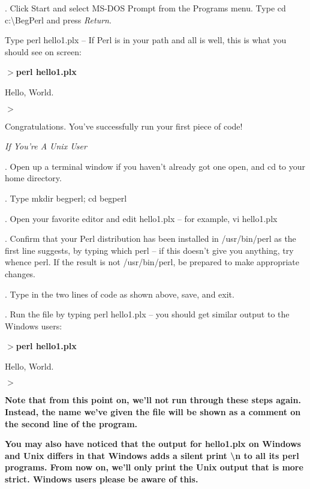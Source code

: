\documentclass[a4paper,11pt]{book}
\begin{document}
. Click Start and select MS-DOS Prompt from the Programs menu. Type cd c:\textbackslash BegPerl and press \textit{Return}.

\noindent 

\noindent Type perl hello1.plx -- If Perl is in your path and all is well, this is what you should see on screen:

\noindent 

\noindent $>$\textbf{perl hello1.plx}

\noindent Hello, World.

\noindent 

\noindent $>$

\noindent 

\noindent Congratulations. You've successfully run your first piece of code!

\noindent 

\noindent \textit{If You're A Unix User}

. Open up a terminal window if you haven't already got one open, and cd to your home directory.

. Type mkdir begperl; cd begperl

. Open your favorite editor and edit hello1.plx -- for example, vi hello1.plx

. Confirm that your Perl distribution has been installed in /usr/bin/perl as the first line suggests, by typing which perl -- if this doesn't give you anything, try whence perl. If the result is not /usr/bin/perl, be prepared to make appropriate changes.

. Type in the two lines of code as shown above, save, and exit.

. Run the file by typing perl hello1.plx -- you should get similar output to the Windows users:

\noindent 

\noindent $>$\textbf{perl hello1.plx}

\noindent Hello, World.

\noindent $>$

\noindent 

\noindent 

\noindent \textbf{Note that from this point on, we'll not run through these steps again. Instead, the name we've given the file will be shown as a comment on the second line of the program.}

\noindent 

\noindent \textbf{You may also have noticed that the output for hello1.plx on Windows and Unix differs in that Windows adds a silent print \textbackslash n to all its perl programs. From now on, we'll only print the Unix output that is more strict. Windows users please be aware of this.}
\end{document}
